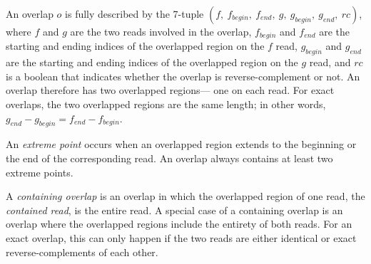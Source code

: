 \documentclass[12pt]{article}
\newcommand{\ReadArrowType}{latex}
\newcommand{\KeyTerm}[1]{{\it #1}}
\begin{document}
An overlap $o$ is fully described by the 7-tuple $(f,\ f_{begin},\ f_{end},\ g,
\ g_{begin},\ g_{end},\ rc)$, where $f$ and $g$ are the two reads involved in the
overlap, $f_{begin}$ and $f_{end}$ are the starting and ending indices of the
overlapped region on the $f$ read, $g_{begin}$ and $g_{end}$ are the starting
and ending indices of the overlapped region on the $g$ read, and $rc$ is a
boolean that indicates whether the overlap is reverse-complement or not.  An
overlap therefore has two overlapped regions--- one on each read.  For exact
overlaps, the two overlapped regions are the same length; in other words,
$g_{end} - g_{begin} = f_{end} - f_{begin}$.

An \KeyTerm{extreme point} occurs when an overlapped region extends to the
beginning or the end of the corresponding read.  An overlap always contains at
least two extreme points.

A \KeyTerm{containing overlap} is an overlap in which the overlapped region of
one read, the \KeyTerm{contained read}, is the entire read.  A special case of a
containing overlap is an overlap where the overlapped regions include the
entirety of both reads.  For an exact overlap, this can only happen if the two
reads are either identical or exact reverse-complements of each other.



\end{document}
